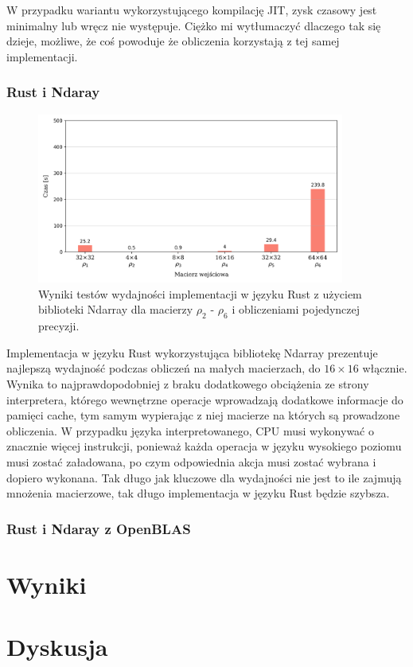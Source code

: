 \documentclass[11pt, a4paper]{article}
\begin{document}
\begin{sloppypar}
    W przypadku wariantu wykorzystującego kompilację JIT, zysk czasowy jest minimalny
    lub wręcz nie występuje. Ciężko mi wytłumaczyć dlaczego tak się dzieje, możliwe, że coś
    powoduje że obliczenia korzystają z tej samej implementacji.

    \subsubsection{ Rust i Ndaray}


    \FloatBarrier
    \begin{figure}[ht]
      \centering
      \includegraphics[width=0.9\textwidth]{"resources/rust_single_tests.png"}
      \caption{Wyniki testów wydajności implementacji w języku Rust z użyciem biblioteki Ndarray dla macierzy $\rho
      _{2}$ - $\rho_{6}$ i obliczeniami pojedynczej precyzji.}
      \label{sp-rust-perf}
    \end{figure}
    \FloatBarrier

    Implementacja w języku Rust wykorzystująca bibliotekę Ndarray prezentuje najlepszą
    wydajność podczas obliczeń na małych macierzach, do $16\times16$ włącznie. Wynika to
    najprawdopodobniej z braku dodatkowego obciążenia ze strony interpretera, którego wewnętrzne
    operacje wprowadzają dodatkowe informacje do pamięci cache, tym samym wypierając z
    niej macierze na których są prowadzone obliczenia. W przypadku języka interpretowanego,
    CPU musi wykonywać o znacznie więcej instrukcji, ponieważ każda operacja w języku wysokiego
    poziomu musi zostać załadowana, po czym odpowiednia akcja musi zostać wybrana i
    dopiero wykonana. Tak długo jak kluczowe dla wydajności nie jest to ile zajmują mnożenia
    macierzowe, tak długo implementacja w języku Rust będzie szybsza.

    \subsubsection{ Rust i Ndaray z OpenBLAS }


    \section{Wyniki}


    \section{Dyskusja}
  \end{sloppypar}
  \newpage
  \begin{sloppypar}
    \medskip


    \printbibliography
    [heading=bibintoc, title={Odwołania}]
  \end{sloppypar}
\end{document}
